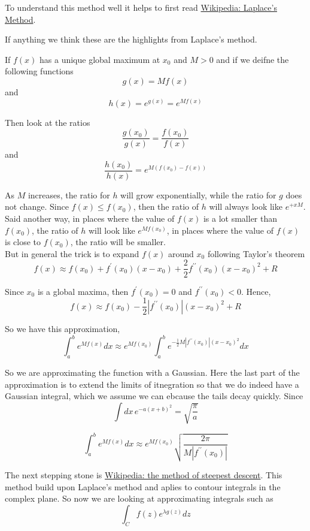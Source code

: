 To understand this method well it helps to first read
\href{https://en.wikipedia.org/wiki/Laplace%27s_method}{Wikipedia: Laplace's Method}.

If anything we think these are the highlights from Laplace's method.

If $f(x)$ has a unique global maximum at $x_0$ and $M>0$ and if we deifne the following functions
$$
g(x) = Mf(x)
$$
and
$$
h(x) = e^{g(x)} = e^{Mf(x)}
$$

Then look at the ratios
$$
\frac{g(x_0)}{g(x)} = \frac{f(x_0)}{f(x)}
$$
and
$$
\frac{h(x_0)}{h(x)} = e^{M(f(x_0) - f(x))}
$$

As $M$ increases, the ratio for $h$ will grow exponentially, while the ratio for $g$ does not change.
Since $f(x) \leq f(x_0)$, then the ratio of $h$ will always look like $e^{+{x}M}$.
Said another way, in places where the value of $f(x)$ is a lot smaller than $f(x_0)$, the ratio of $h$ will look like
$e^{Mf(x_0)}$, in places where the value of $f(x)$ is close to $f(x_0)$, the ratio will be smaller.
\\

But in general the trick is to expand $f(x)$ around $x_0$ following Taylor's theorem
$$
f(x) \approx
    f(x_0) + f^{\prime} (x_0) (x-x_0) + \frac{2}{2} f^{\prime\prime} (x_0) (x-x_0)^2 + R
$$

Since $x_0$ is a global maxima, then $f^{\prime} (x_0) = 0$ and $f^{\prime\prime} (x_0) < 0$.
Hence,
$$
f(x) \approx
    f(x_0) - \frac{1}{2} |f^{\prime\prime} (x_0)| (x-x_0)^2 + R
$$

So we have this approximation,
$$
\int_{a}^{b} e^{Mf(x)} dx \approx
    e^{Mf(x_0)} \int_{a}^{b} e^{- \frac{1}{2} M |f^{\prime\prime} (x_0)| (x-x_0)^2} dx
$$

So we are approximating the function with a Gaussian.
Here the last part of the approximation is to extend the limits of itnegration so that we do indeed have a Gaussian integral,
which we assume we can ebcause the tails decay quickly.
Since
$$
\int dx\, e^{-a(x+b)^2} = \sqrt{ \frac{\pi}{a} }
$$

$$
\int_{a}^{b} e^{Mf(x)} dx \approx
    e^{Mf(x_0)} \sqrt{ \frac{2\pi}{M |f^{\prime\prime} (x_0)|} }
$$

The next stepping stone is
\href{https://en.wikipedia.org/wiki/Method_of_steepest_descent}{Wikipedia: the method of steepest descent}.
This method build upon Laplace's method and aplies to contour integrals in the complex plane.
So now we are looking at approximating integrals such as
$$
\int_{C} f(z) e^{\lambda g(z)} dz
$$



